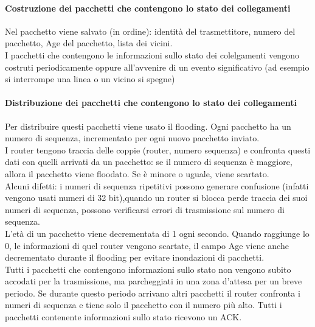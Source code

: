 \documentclass{article}
\begin{document}
\paragraph{Costruzione dei pacchetti che contengono lo stato dei collegamenti}
Nel pacchetto viene salvato (in ordine): identità del trasmettitore, numero del pacchetto, Age del pacchetto, lista dei vicini. \\
I pacchetti che contengono le informazioni sullo stato dei colelgamenti vengono costruti periodicamente oppure all'avvenire di un evento significativo (ad esempio si interrompe una linea o un vicino si spegne) \\
\paragraph{Distribuzione dei pacchetti che contengono lo stato dei collegamenti}
Per distribuire questi pacchetti viene usato il flooding. Ogni pacchetto ha un numero di sequenza, incrementato per ogni nuovo pacchetto inviato. \\
I router tengono traccia delle coppie (router, numero sequenza) e confronta questi dati con quelli arrivati da un pacchetto: se il numero di sequenza è maggiore, allora il pacchetto viene floodato. Se è minore o uguale, viene scartato.\\
Alcuni difetti: i numeri di sequenza ripetitivi possono generare confusione (infatti vengono usati numeri di 32 bit),quando un router si blocca perde traccia dei suoi numeri di sequenza, possono verificarsi errori di trasmissione sul numero di sequenza.\\
L'età di un pacchetto viene decrementata di 1 ogni secondo. Quando raggiunge lo 0, le informazioni di quel router vengono scartate, il campo Age viene anche decrementato durante il flooding per evitare inondazioni di pacchetti.\\
Tutti i pacchetti che contengono informazioni sullo stato non vengono subito accodati per la trasmissione, ma parcheggiati in una zona d'attesa per un breve periodo. Se durante questo periodo arrivano altri pacchetti il router confronta i numeri di sequenza e tiene solo il pacchetto con il numero più alto. Tutti i pacchetti contenente informazioni sullo stato ricevono un ACK.\\
\end{document}
